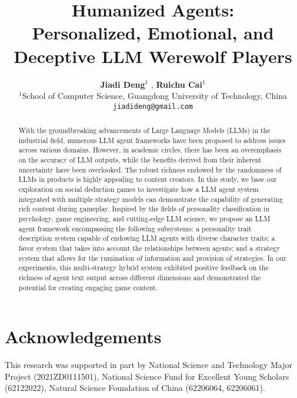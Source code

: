 \documentclass[11pt]{article}
\title{Humanized Agents: \\ Personalized, Emotional, and Deceptive LLM Werewolf Players}
\author{ \textbf{Jiadi Deng}$^{1}$ ,  \textbf{Ruichu Cai}$^{1}$ \\
$^{1}$School of  Computer Science, Guangdong University of Technology, China \\
  \texttt{jiadideng@gmail.com} 
  }
\begin{document}
\maketitle
\begin{abstract}
  With the groundbreaking advancements of Large Language Models (LLMs) in the industrial field, numerous LLM agent frameworks have been proposed to address issues across various domains. However, in academic circles, there has been an overemphasis on the accuracy of LLM outputs, while the benefits derived from their inherent uncertainty have been overlooked. The robust richness endowed by the randomness of LLMs in products is highly appealing to content creators. In this study, we base our exploration on social deduction games to investigate how a LLM agent system integrated with multiple strategy models can demonstrate the capability of generating rich content during gameplay. Inspired by the fields of personality classification in psychology, game engineering, and cutting-edge LLM science, we propose an LLM agent framework encompassing the following subsystems: a personality trait description system capable of endowing LLM agents with diverse character traits; a favor system that takes into account the relationships between agents; and a strategy system that allows for the rumination of information and provision of strategies. In our experiments, this multi-strategy hybrid system exhibited positive feedback on the richness of agent text output across different dimensions and demonstrated the potential for creating engaging game content.

\end{abstract}












\section*{Acknowledgements}
This research was supported in part by  National Science and Technology Major Project (2021ZD0111501), National Science Fund for Excellent Young Scholars (62122022), Natural Science Foundation of China (62206064, 62206061). 




\clearpage
\appendix

\label{sec:appendix}


\end{document}
